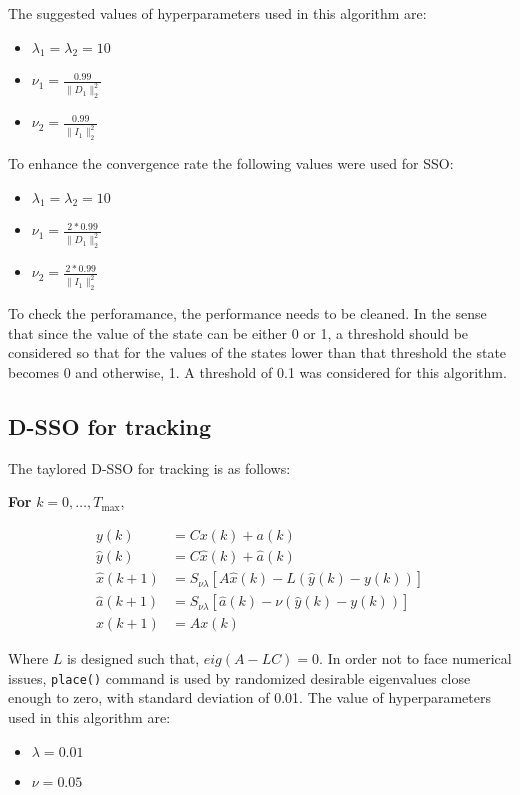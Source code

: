 The suggested values of hyperparameters used in this algorithm are:
\begin{itemize}
	\item $\lambda_1 = \lambda_2 = 10$
	\item $\nu_1 = \frac{0.99}{\|D_1\|_2^2}$
	\item $\nu_2 = \frac{0.99}{\|I_1\|_2^2}$
\end{itemize} 
To enhance the convergence rate the following values were used for SSO:
\begin{itemize}
	\item $\lambda_1 = \lambda_2 = 10$
	\item $\nu_1 = \frac{2*0.99}{\|D_1\|_2^2}$
	\item $\nu_2 = \frac{2*0.99}{\|I_1\|_2^2}$
\end{itemize} 
To check the perforamance, the performance needs to be cleaned. In the sense that since the value of the state can be either 0 or 1,  a threshold should be considered so that for the values of the states lower than that threshold the state becomes 0 and otherwise, 1. A threshold of 0.1 was considered for this algorithm.
\subsection{D-SSO for tracking}
The taylored D-SSO for tracking is as follows:

\textbf{For} \( k = 0, \dots, T_{\max} \),

\begin{align}
    y(k) &= Cx(k) + a(k) \\
    \hat{y}(k) &= C\hat{x}(k) + \hat{a}(k) \\
    \hat{x}(k+1) &= S_{\nu\lambda}[A\hat{x}(k) - L (\hat{y}(k) - y(k))] \\
    \hat{a}(k+1) &= S_{\nu\lambda} [\hat{a}(k) - \nu (\hat{y}(k) - y(k))] \\
    x(k+1) &= A x(k)
\end{align}

Where $L$ is designed such that, $eig(A - LC) = 0$. In order not to face numerical issues, \texttt{place()} command is used by randomized desirable eigenvalues close enough to zero, with standard deviation of 0.01. The value of hyperparameters used in this algorithm are:
\begin{itemize}
	\item $\lambda = 0.01$
	\item $\nu = 0.05$
\end{itemize} 

